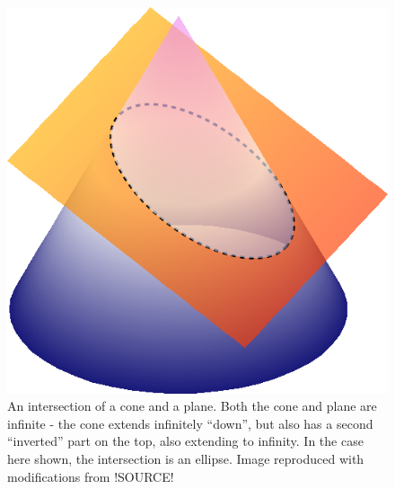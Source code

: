 \begin{figure}
  \begin{center}
    \includegraphics[scale=0.75]{figs/mechanics/cone_plane_3d.pdf}
  \end{center}
  \caption{An intersection of a cone and a plane. Both the cone and plane are infinite - the cone extends infinitely \enquote{down}, but also has a second \enquote{inverted} part on the top, also extending to infinity. In the case here shown, the intersection is an ellipse. Image reproduced with modifications from !SOURCE!} %
  \label{fig:3d_conic_1}
\end{figure}


